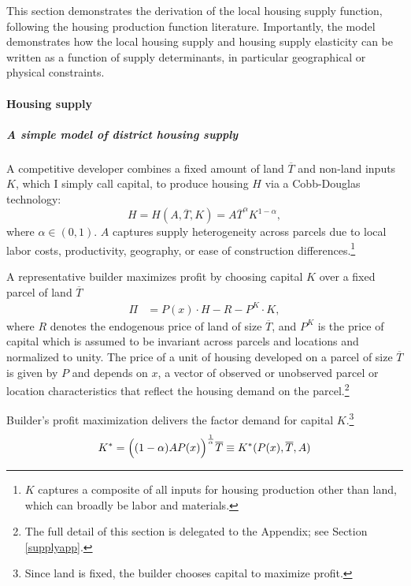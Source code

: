\documentclass[
  12pt,
]{article}
\begin{document}
This section demonstrates the derivation of the local housing supply function, following the housing production function literature. Importantly, the model demonstrates how the local housing supply and housing supply elasticity can be written as a function of supply determinants, in particular geographical or physical constraints.

\paragraph{Housing supply}\label{housing-supply}

\subparagraph*{A simple model of district housing supply}\label{a-simple-model-of-district-housing-supply}

A competitive developer combines a fixed amount of land \(\overline{T}\) and non-land inputs \(K\), which I simply call capital, to produce housing \(H\) via a Cobb-Douglas technology:\begin{equation}
    H = H(A, \overline{T}, K) = A \overline{T}^{\alpha} K^{1-\alpha}
    \label{eq:cobb},
\end{equation} where \(\alpha \in (0, 1)\). \(A\) captures supply heterogeneity across parcels due to local labor costs, productivity, geography, or ease of construction differences.\footnote{\(K\) captures a composite of all inputs for housing production other than land, which can broadly be labor and materials.}

A representative builder maximizes profit by choosing capital \(K\) over a fixed parcel of land \(\overline{T}\) \[\begin{aligned}
\Pi &= P(x) \cdot H - R - P^K\cdot K,
\end{aligned}\]where \(R\) denotes the endogenous price of land of size \(\overline{T}\), and \(P^K\) is the price of capital which is assumed to be invariant across parcels and locations and normalized to unity. The price of a unit of housing developed on a parcel of size \(\overline{T}\) is given by \(P\) and depends on \(x\), a vector of observed or unobserved parcel or location characteristics that reflect the housing demand on the parcel.\footnote{The full detail of this section is delegated to the Appendix; see Section \ref{supplyapp}.}

Builder's profit maximization delivers the factor demand for capital \(K\).\footnote{Since land is fixed, the builder chooses capital to maximize profit.} \[\begin{aligned}
 K^* = \Bigl((1-\alpha)AP(x)\Bigr)^{\frac{1}{\alpha}}\overline{T}\equiv K^*(P(x), \overline{T}, A) \end{aligned}\]
\end{document}
